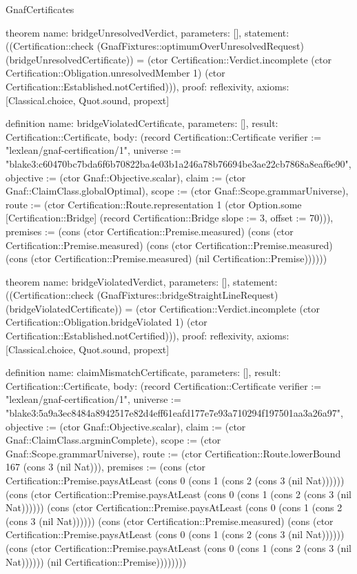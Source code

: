 \begin{lexlean}{GnafCertificates}
\begin{semanticmodule}
theorem{
  name: bridgeUnresolvedVerdict,
  parameters: [],
  statement: ((Certification::check (GnafFixtures::optimumOverUnresolvedRequest) (bridgeUnresolvedCertificate)) = (ctor Certification::Verdict.incomplete (ctor Certification::Obligation.unresolvedMember 1) (ctor Certification::Established.notCertified))),
  proof: reflexivity{},
  axioms: [Classical.choice, Quot.sound, propext]
}

definition{
  name: bridgeViolatedCertificate,
  parameters: [],
  result: Certification::Certificate,
  body: (record Certification::Certificate {verifier := "lexlean/gnaf-certification/1", universe := "blake3:c60470bc7bda6f6b70822ba4e03b1a246a78b76694be3ae22cb7868a8eaf6e90", objective := (ctor Gnaf::Objective.scalar), claim := (ctor Gnaf::ClaimClass.globalOptimal), scope := (ctor Gnaf::Scope.grammarUniverse), route := (ctor Certification::Route.representation 1 (ctor Option.some [Certification::Bridge] (record Certification::Bridge {slope := 3, offset := 70}))), premises := (cons (ctor Certification::Premise.measured) (cons (ctor Certification::Premise.measured) (cons (ctor Certification::Premise.measured) (cons (ctor Certification::Premise.measured) (nil Certification::Premise)))))})
}

theorem{
  name: bridgeViolatedVerdict,
  parameters: [],
  statement: ((Certification::check (GnafFixtures::bridgeStraightLineRequest) (bridgeViolatedCertificate)) = (ctor Certification::Verdict.incomplete (ctor Certification::Obligation.bridgeViolated 1) (ctor Certification::Established.notCertified))),
  proof: reflexivity{},
  axioms: [Classical.choice, Quot.sound, propext]
}

definition{
  name: claimMismatchCertificate,
  parameters: [],
  result: Certification::Certificate,
  body: (record Certification::Certificate {verifier := "lexlean/gnaf-certification/1", universe := "blake3:5a9a3ec8484a8942517e82d4eff61eafd177e7e93a710294f197501aa3a26a97", objective := (ctor Gnaf::Objective.scalar), claim := (ctor Gnaf::ClaimClass.argminComplete), scope := (ctor Gnaf::Scope.grammarUniverse), route := (ctor Certification::Route.lowerBound 167 (cons 3 (nil Nat))), premises := (cons (ctor Certification::Premise.paysAtLeast (cons 0 (cons 1 (cons 2 (cons 3 (nil Nat)))))) (cons (ctor Certification::Premise.paysAtLeast (cons 0 (cons 1 (cons 2 (cons 3 (nil Nat)))))) (cons (ctor Certification::Premise.paysAtLeast (cons 0 (cons 1 (cons 2 (cons 3 (nil Nat)))))) (cons (ctor Certification::Premise.measured) (cons (ctor Certification::Premise.paysAtLeast (cons 0 (cons 1 (cons 2 (cons 3 (nil Nat)))))) (cons (ctor Certification::Premise.paysAtLeast (cons 0 (cons 1 (cons 2 (cons 3 (nil Nat)))))) (nil Certification::Premise)))))))})
}


\end{semanticmodule}
\end{lexlean}
